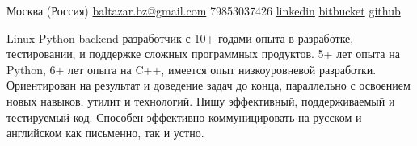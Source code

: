 \documentclass[unicode, 10pt, a4paper, oneside, fleqn]{article}
\begin{document}
\sloppy  %


\nobreakvspace{0.3em}  %

Москва (Россия)
\sbull
\href{mailto:baltazar.bz@gmail.com}{baltazar.bz\mbox{}@\mbox{}gmail.com}\sbull
\textsmaller{+}79853037426\sbull
\href{http://ru.linkedin.com/pub/yuri-bochkarev/21/3a9/555}{linkedin}
\sbull
\href{https://bitbucket.org/balta2ar}{bitbucket}
\sbull
\href{https://github.com/balta2ar}{github}


\noindent
Linux Python backend-разработчик с 10+ годами опыта в разработке,
    тестировании, и поддержке сложных программных продуктов. 5+ лет опыта на
    Python, 6+ лет опыта на C++, имеется опыт низкоуровневой разработки.
    Ориентирован на результат и доведение задач до конца, параллельно с
    освоением новых навыков, утилит и технологий. Пишу эффективный,
    поддерживаемый и тестируемый код. Способен эффективно коммуницировать на
    русском и английском как письменно, так и устно.


\end{document}
